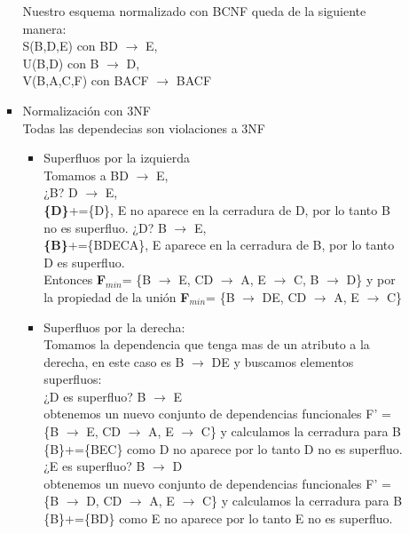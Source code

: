 \documentclass{article}
\begin{document}
\begin{enumerate}
\begin{itemize}
\begin{itemize}
    			Nuestro esquema normalizado con BCNF queda de la siguiente manera:\\
    			S(B,D,E) con BD $\rightarrow$ E,\\
    			U(B,D) con B $\rightarrow$ D,  \\
    			V(B,A,C,F) con BACF $\rightarrow$ BACF
    			
    			\item Normalización con 3NF\\
    			Todas las dependecias son violaciones a 3NF\\
    			\begin{itemize}
    				\item Superfluos por la izquierda\\
    				Tomamos a BD $\rightarrow$ E,\\
    				¿B? D $\rightarrow$ E,\\
    				\textbf{\{D\}}+=\{D\}, E no aparece en la cerradura de D, por lo tanto B no es superfluo.
    				¿D? B $\rightarrow$ E,\\
    				\textbf{\{B\}}+=\{BDECA\}, E aparece en la cerradura de B, por lo tanto D es superfluo.\\
    				
    				Entonces \textbf{F$_{min}$}= \{B $\rightarrow$ E, CD $\rightarrow$ A, E $\rightarrow$ C, B $\rightarrow$ D\} y por la propiedad de la unión \textbf{F$_{min}$}= \{B $\rightarrow$ DE, CD $\rightarrow$ A, E $\rightarrow$ C\} \\
    				
    				
    				\item Superfluos por la derecha:\\
    				Tomamos la dependencia que tenga mas de un atributo a la derecha, en este caso es B $\rightarrow$ DE y buscamos elementos superfluos:\\
    				¿D es superfluo? B $\rightarrow$ E \\
    				obtenemos un nuevo conjunto de dependencias funcionales F' = \{B $\rightarrow$ E, CD $\rightarrow$ A, E $\rightarrow$ C\} y calculamos la cerradura para B\\
    				\{B\}+=\{BEC\} como D no aparece por lo tanto D no es superfluo.\\
    				
    				¿E es superfluo? B $\rightarrow$ D \\
    				obtenemos un nuevo conjunto de dependencias funcionales F' = \{B $\rightarrow$ D, CD $\rightarrow$ A, E $\rightarrow$ C\} y calculamos la cerradura para B\\
    				\{B\}+=\{BD\} como E no aparece por lo tanto E no es superfluo.\\
    				

\end{itemize}
\end{itemize}
\end{itemize}
\end{enumerate}
\end{document}
